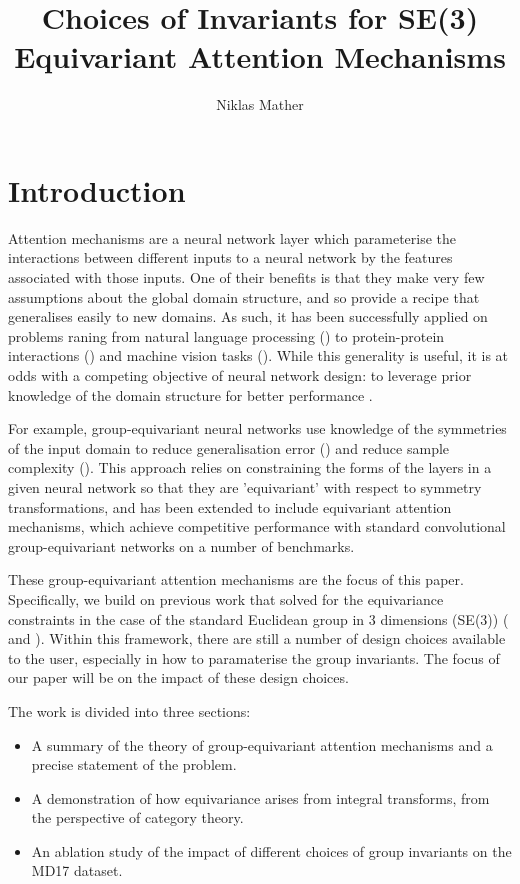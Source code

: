 \documentclass[11pt]{article}
\begin{document}
\title{Choices of Invariants for SE(3) Equivariant Attention Mechanisms}
\author{Niklas Mather}
\maketitle

\section{Introduction}

Attention mechanisms are a neural network layer which parameterise the interactions between different inputs to a neural network by the features associated with those inputs. One of their benefits is that they make very few assumptions about the global domain structure, and so provide a recipe that generalises easily to new domains. As such, it has been successfully applied on problems raning from natural language processing (\cite{vaswani2017attention}) to protein-protein interactions (\cite{velivckovic2017graph}) and machine vision tasks (\cite{vision_transformer}). While this generality is useful, it is at odds with a competing objective of neural network design: to leverage prior knowledge of the domain structure for better performance .

For example, group-equivariant neural networks use knowledge of the symmetries of the input domain to reduce generalisation error (\cite{volumetric}) and reduce sample complexity (\cite{winkels2019pulmonary}). This approach relies on constraining the forms of the layers in a given neural network so that they are 'equivariant' with respect to symmetry transformations, and has been extended to include equivariant attention mechanisms, which achieve competitive performance with standard convolutional group-equivariant networks on a number of benchmarks.
  
These group-equivariant attention mechanisms are the focus of this paper. Specifically, we build on previous work that solved for the equivariance constraints in the case of the standard Euclidean group in 3 dimensions (SE(3)) (\cite*{volumetric} and \cite*{rototranslational}). Within this framework, there are still a number of design choices available to the user, especially in how to paramaterise the group invariants. The focus of our paper will be on the impact of these design choices.

The work is divided into three sections: \begin{itemize}
	\item A summary of the theory of group-equivariant attention mechanisms and a precise statement of the problem.
	\item A demonstration of how equivariance arises from integral transforms, from the perspective of category theory.
	\item An ablation study of the impact of different choices of group invariants on the MD17 dataset. 
\end{itemize}
\end{document}
